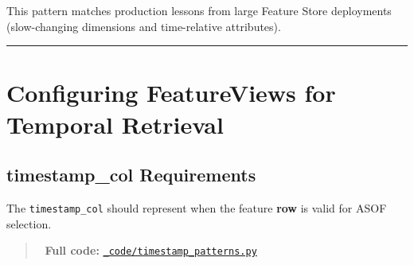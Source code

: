 \documentclass[
  letterpaper,
  DIV=11,
  numbers=noendperiod]{scrreprt}
\begin{document}
This pattern matches production lessons from large Feature Store
deployments (slow-changing dimensions and time-relative attributes).

\begin{center}\rule{0.5\linewidth}{0.5pt}\end{center}

\hypertarget{configuring-featureviews-for-temporal-retrieval}{%
\section{Configuring FeatureViews for Temporal
Retrieval}\label{configuring-featureviews-for-temporal-retrieval}}

\hypertarget{timestamp_col-requirements}{%
\subsection{timestamp\_col
Requirements}\label{timestamp_col-requirements}}

The \texttt{timestamp\_col} should represent when the feature
\textbf{row} is valid for ASOF selection.

\begin{quote}
📁 \textbf{Full code:}
\href{_code/timestamp_patterns.py}{\texttt{\_code/timestamp\_patterns.py}}
\end{quote}
\end{document}
